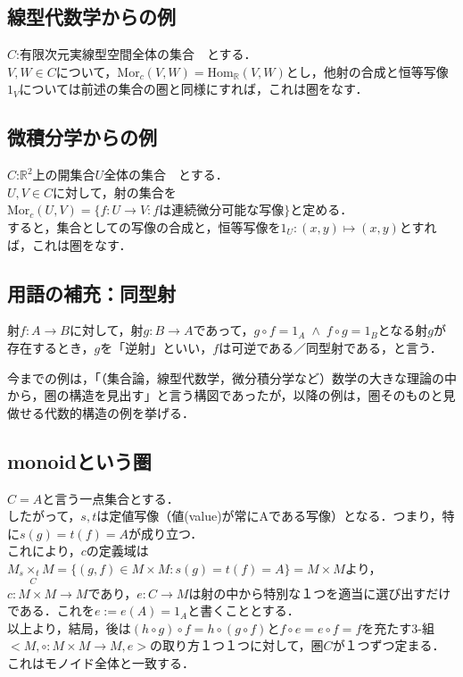 \documentclass[uplatex, 12pt, a4paper, dvipdfmx]{jsarticle}
\begin{document}
\subsection{線型代数学からの例}

$C$:有限次元実線型空間全体の集合　とする．\\
$V,W\in C$について，$\mathrm{Mor}_c(V,W)=\mathrm{Hom}_\mathbb{R}(V,W)$とし，他射の合成と恒等写像$1_V$については前述の集合の圏と同様にすれば，これは圏をなす．

\subsection{微積分学からの例}

$C$:$\mathbb{R}^2$上の開集合$U$全体の集合　とする．\\
$U,V\in C$に対して，射の集合を$\mathrm{Mor}_c(U,V)=\{f:U\longrightarrow V: f\text{は連続微分可能な写像}\}$と定める．\\
すると，集合としての写像の合成と，恒等写像を$1_U:(x,y)\longmapsto (x,y)$とすれば，これは圏をなす．

\subsection{用語の補充：同型射}

\begin{shadebox}\begin{definition}[可逆，同型，逆射]
    射$f:A\longrightarrow B$に対して，射$g:B\longrightarrow A$であって，$g\circ f=1_A \; \wedge \; f\circ g=1_B$となる射$g$が存在するとき，$g$を「逆射」といい，$f$は可逆である／同型射である，と言う．
\end{definition}\end{shadebox}

今までの例は，「（集合論，線型代数学，微分積分学など）数学の大きな理論の中から，圏の構造を見出す」と言う構図であったが，以降の例は，圏そのものと見做せる代数的構造の例を挙げる．

\subsection{monoidという圏}

$C={A}$と言う一点集合とする．\\
したがって，$s,t$は定値写像（値(value)が常にAである写像）となる．つまり，特に$s(g)=t(f)=A$が成り立つ．\\
これにより，$c$の定義域は$M_s\underset{C}{\times_t}M=\{ (g,f)\in M\times M : s(g)=t(f)=A \}=M\times M$より，$c:M\times M\longrightarrow M$であり，$e:C\longrightarrow M$は射の中から特別な１つを適当に選び出すだけである．これを$e:=e(A)=1_A$と書くこととする．\\
以上より，結局，後は$(h\circ g)\circ f = h\circ (g\circ f)$と$f\circ e=e\circ f = f$を充たす3-組$<M,\circ :M\times M\longrightarrow M,e>$の取り方１つ１つに対して，圏$C$が１つずつ定まる．\\
これはモノイド全体と一致する．\\
\end{document}
